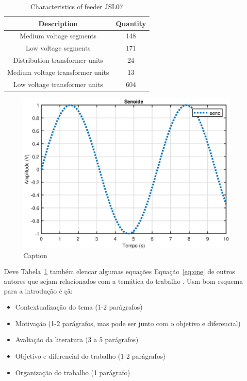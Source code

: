 \documentclass{article}
\begin{document}
\begin{table}[H]
  \centering
  \caption{Characteristics of feeder JSL07}
    \begin{tabular}{cc}
    \toprule
    \textbf{Description} & \textbf{Quantity} \\
    \midrule
    Medium voltage segments & 148 \\
    Low voltage segments & 171 \\
    Distribution transformer units & 24 \\
    Medium voltage transformer units & 13 \\
    Low voltage transformer units & 604 \\
    \bottomrule
    \end{tabular}%
  \label{tab:jsl07}%
\end{table}%

\begin{figure}[H]
    \centering
    \includegraphics{teste.eps}
    \caption{Caption}
    \label{fig:enter-label}
\end{figure}

Deve Tabela~\ref{tab:jsl07} também elencar algumas equações Equação~\eqref{eq:one} de outros autores que sejam relacionados com a temática do trabalho \cite{INOUE2011}. 
Usm bom esquema para a introdução é \c{c}\~a:



\begin{itemize}
    \item Contextualização do tema (1-2 parágrafos) \cite{JESSICA2011}
    \item Motivação (1-2 parágrafos, mas pode ser junto com o objetivo e diferencial)
    \item Avaliação da literatura (3 a 5 parágrafos)
    \item Objetivo e diferencial do trabalho (1-2 parágrafos)
    \item Organização do trabalho (1 parágrafo) \cite{Joao2011}
\end{itemize}
\end{document}
